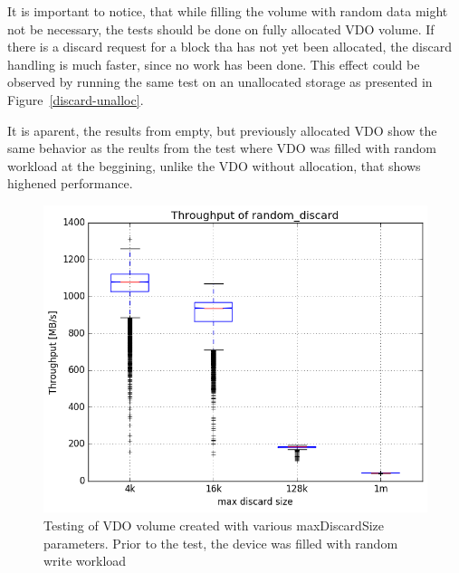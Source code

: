 \documentclass[
  color, %
  table, %
  lof,   %
  lot,   %
]{fithesis3}
\begin{document}
It is important to notice, that while filling the volume with random data might not be necessary, the tests should be done on fully allocated VDO volume. If there is a discard request for a block tha has not yet been allocated, the discard handling is much faster, since no work has been done. This effect could be observed by running the same test on an unallocated storage as presented in Figure~\ref{discard-unalloc}.

It is aparent, the results from empty, but previously allocated VDO show the same behavior as the reults from the test where VDO was filled with random workload at the beggining, unlike the VDO without allocation, that shows highened performance.


\begin{figure}[!htb]
        \centering
        \includegraphics[width=\textwidth]{../results/discards/full_VDO/report/random_discard1_compare_boxplots}
\caption[Discards]{Testing of VDO volume created with various maxDiscardSize parameters. Prior to the test, the device was filled with random write workload}
\label{fig:discard-full}
        \centering

\end{figure}
\end{document}
